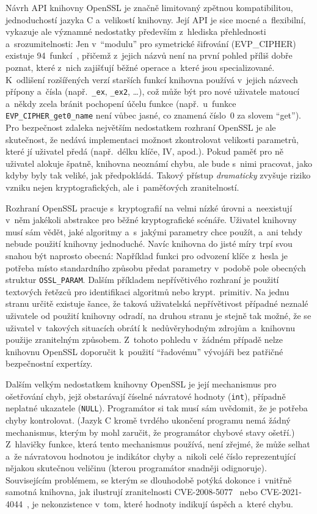 Návrh API knihovny OpenSSL je značně limitovaný zpětnou kompatibilitou, jednoduchostí jazyka C a~velikostí knihovny. Její API je sice mocné a~flexibilní, vykazuje ale významné nedostatky především z~hlediska přehlednosti a~srozumitelnosti: Jen v~``modulu'' pro symetrické šifrování (EVP\_CIPHER) existuje 94~funkcí~\cite{openssl-evp-encryptinit}, přičemž z~jejich názvů není na první pohled příliš dobře poznat, které z~nich zajišťují běžné operace a~které jsou specializované. K~odlišení rozšířených verzí starších funkcí knihovna používá v~jejich názvech přípony a~čísla (např.\ \texttt{\_ex}, \texttt{\_ex2}, \dots), což může být pro nové uživatele matoucí a~někdy zcela bránit pochopení účelu funkce (např.\ u~funkce \texttt{EVP\_CIPHER\_get0\_name} není vůbec jasné, co znamená číslo~0 za slovem ``get''). Pro bezpečnost zdaleka největším nedostatkem rozhraní OpenSSL je ale skutečnost, že nedává implementaci možnost zkontrolovat velikosti parametrů, které jí uživatel předá (např.\ délku klíče, IV, apod.). Pokud paměť pro ně uživatel alokuje špatně, knihovna neoznámí chybu, ale bude s~nimi pracovat, jako kdyby byly tak veliké, jak předpokládá. Takový přístup \emph{dramaticky} zvyšuje riziko vzniku nejen kryptografických, ale i~paměťových zranitelností.

Rozhraní OpenSSL pracuje s~kryptografií na velmi nízké úrovni a~neexistují v~něm jakékoli abstrakce pro běžné kryptografické scénáře. Uživatel knihovny musí sám vědět, jaké algoritmy a~s~jakými parametry chce použít, a~ani tehdy nebude použití knihovny jednoduché. Navíc knihovna do jisté míry trpí svou snahou být naprosto obecná: Například funkci pro odvození klíče z~hesla je potřeba místo standardního způsobu předat parametry v~podobě pole obecných struktur \texttt{OSSL\_PARAM}. Dalším příkladem nepřívětivého rozhraní je použití textových řetězců pro identifikaci algoritmů nebo krypt.\ primitiv. Na jednu stranu určitě existuje šance, že taková uživatelská nepřívětivost případné neznalé uživatele od použití knihovny odradí, na druhou stranu je stejně tak možné, že se uživatel v~takových situacích obrátí k~nedůvěryhodným zdrojům a~knihovnu použije zranitelným způsobem. Z~tohoto pohledu v~žádném případě nelze knihovnu OpenSSL doporučit k~použití ``řadovému'' vývojáři bez patřičné bezpečnostní expertízy.

Dalším velkým nedostatkem knihovny OpenSSL je její mechanismus pro ošetřování chyb, jejž obstarávají číselné návratové hodnoty (\texttt{int}), případně neplatné ukazatele (\texttt{NULL}). Programátor si tak musí sám uvědomit, že je potřeba chyby kontrolovat. (Jazyk C kromě tvrdého ukončení programu nemá žádný mechanismus, kterým by mohl zaručit, že programátor chybové stavy ošetří.) Z~hlavičky funkce, která tento mechanismus používá, není zřejmé, že může selhat a~že návratovou hodnotou je indikátor chyby a~nikoli celé číslo reprezentující nějakou skutečnou veličinu (kterou programátor snadněji odignoruje). Souvisejícím problémem, se kterým se dlouhodobě potýká dokonce i~vnitřně samotná knihovna, jak ilustrují zranitelnosti CVE-2008-5077~\cite{cve-2008-5077} nebo CVE-2021-4044~\cite{cve-2021-4044}, je nekonzistence v~tom, které hodnoty indikují úspěch a~které chybu.

